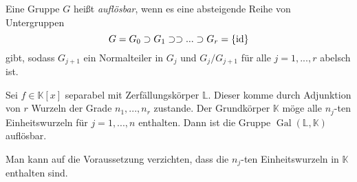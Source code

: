 \documentclass{cheat-sheet}
\newcommand{\K}{\mathbb{K}} %
\renewcommand{\L}{\mathbb{L}} %
\DeclareMathOperator{\Gal}{Gal} %
\begin{document}
\begin{defn}
  Eine Gruppe $G$ heißt \emph{auflösbar}, wenn es eine absteigende Reihe von Untergruppen
  \[ G = G_0 \supset G_1 \supset \supset ... \supset G_r = \{ \mathrm{id} \} \]
  gibt, sodass $G_{j+1}$ ein Normalteiler in $G_j$ und $G_{j} / G_{j+1}$ für alle $j = 1, ..., r$ abelsch ist.
\end{defn}

\begin{satz}
  Sei $f \in \K[x]$ separabel mit Zerfällungskörper $\L$. Dieser komme durch Adjunktion von $r$ Wurzeln der Grade $n_1, ..., n_r$ zustande. Der Grundkörper $\K$ möge alle $n_j$-ten Einheitswurzeln für $j = 1, ..., n$ enthalten. Dann ist die Gruppe $\Gal(\L, \K)$ auflösbar.
\end{satz}

\begin{bem}
  Man kann auf die Voraussetzung verzichten, dass die $n_j$-ten Einheitswurzeln in $\K$ enthalten sind.
\end{bem}
\end{document}
